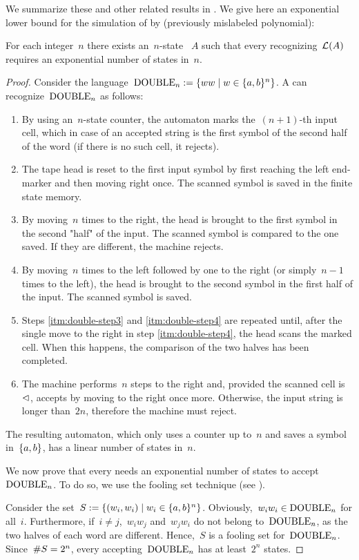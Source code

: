 We summarize these and other related results in .
We give here an exponential lower bound for the simulation of \OMODLAs by \ONFAs (previously mislabeled polynomial):
\begin{thrm}\label{thm:OM1DLAto1NFAlower}
	For each integer~$n$ there exists an~$n$-state \OMODLA~$A$ such that every \ONFA recognizing~$\mathcal L(A)$ requires an exponential number of states in~$n$.
\end{thrm}
\begin{proof}
	Consider the language~$\mathrm{DOUBLE}_n:=\{ww\mid w\in\{a,b\}^n\}$.
	A \OMODLA can recognize~$\mathrm{DOUBLE}_n$ as follows:
	\begin{enumerate}
		\item By using an~$n$-state counter, the automaton marks the~$(n+1)$-th input cell, which in case of an accepted string is the first symbol of the second half of the word (if there is no such cell, it rejects).
		\item The tape head is reset to the first input symbol by first reaching the left end-marker and then moving right once. The scanned symbol is saved in the finite state memory.
		\item\label{itm:double-step3} By moving~$n$ times to the right, the head is brought to the first symbol in the second "half" of the input. The scanned symbol is compared to the one saved.
		      If they are different, the machine rejects.
		\item\label{itm:double-step4} By moving~$n$ times to the left followed by one to the right (or simply~$n-1$ times to the left), the head is brought to the second symbol in the first half of the input. The scanned symbol is saved.
		\item Steps \ref{itm:double-step3} and \ref{itm:double-step4} are repeated until, after the single move to the right in step \ref{itm:double-step4}, the head scans the marked cell. When this happens, the comparison of the two halves has been completed.
		\item The machine performs~$n$ steps to the right and, provided the scanned cell is~$\lhd$, accepts by moving to the right once more.
		      Otherwise, the input string is longer than~$2n$, therefore the machine must reject.
	\end{enumerate}
	The resulting automaton, which only uses a counter up to~$n$ and saves a symbol in~$\{a,b\}$, has a linear number of states in~$n$.

	We now prove that every \ONFA needs an exponential number of states to accept~$\mathrm{DOUBLE}_n$.
	To do so, we use the fooling set technique (see ).

	Consider the set~$S:=\{(w_i,w_i)\mid w_i\in\{a,b\}^n\}$.
	Obviously,~$w_iw_i\in\mathrm{DOUBLE}_n$ for all~$i$.
	Furthermore, if~$i\ne j$,~$w_iw_j$ and~$w_jw_i$ do not belong to~$\mathrm{DOUBLE}_n$, as the two halves of each word are different.
	Hence,~$S$ is a fooling set for~$\mathrm{DOUBLE}_n$.
	Since~$\# S=2^n$, every \ONFA accepting~$\mathrm{DOUBLE}_n$ has at least~$2^n$ states.
\end{proof}
